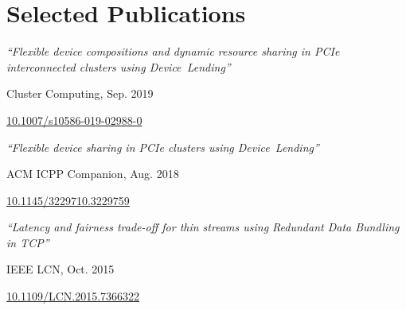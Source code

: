 \section{Selected Publications}

\newcommand{\pub}[4]{
	\begin{footnotesize}
	\parbox[t][][t]{\linewidth}{%
		\parbox{\linewidth}{\textit{``#4''}}
		\parbox{\linewidth}{{#2}, {#1}}
		\parbox{\linewidth}{{\href{https://doi.org/#3}{#3}}}
	}
	\end{footnotesize}
	\bigbreak
}

\pub{Sep. 2019}{Cluster Computing}{10.1007/s10586-019-02988-0}{Flexible device compositions and dynamic resource
sharing in PCIe interconnected clusters using Device~Lending}

\pub{Aug. 2018}{ACM ICPP Companion}{10.1145/3229710.3229759}{Flexible device sharing in PCIe clusters using
Device~Lending}

\pub{Oct. 2015}{IEEE LCN}{10.1109/LCN.2015.7366322}{Latency and fairness trade-off for thin streams using
Redundant Data Bundling in TCP}
